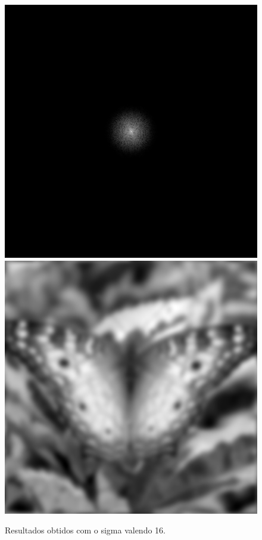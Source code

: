 \documentclass[twoside,twocolumn]{article}
\begin{document}
\begin{figure}[H]
\begin{center}
	\includegraphics[scale=.19]{figures/butterfly_mag_filter_16.png}
	\includegraphics[scale=.19]{figures/butterfly_result_16.png}
\caption{Resultados obtidos com o sigma valendo 16.} \label{mag_64}
\end{center}
\end{figure}
\end{document}
